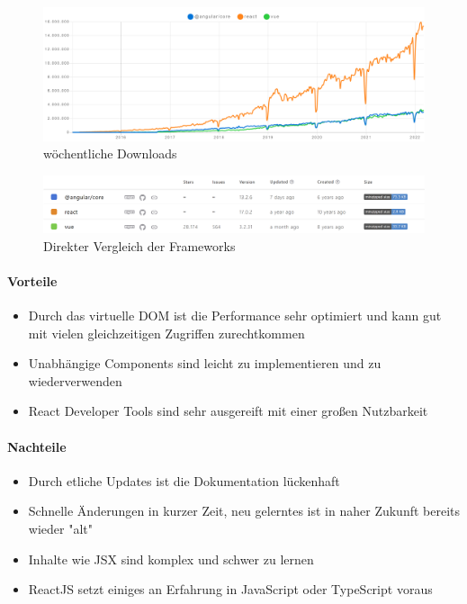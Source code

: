 \begin{figure}[hbt!]
    \centering
    \includegraphics[scale=0.15]{pics/angular-react-vue-npm-chart}
    \caption{wöchentliche Downloads~\cite{angular-react-vue-stats}}
    \label{fig:angular-react-vue-chart}
\end{figure}
\begin{figure}[hbt!]
    \centering
    \includegraphics[scale=0.5]{pics/angular-react-vue-npm-stats}
    \caption{Direkter Vergleich der Frameworks~\cite{angular-react-vue-stats}}
    \label{fig:angular-react-vue-stats}
\end{figure}

\paragraph{Vorteile}
\begin{itemize}
    \item Durch das virtuelle DOM ist die Performance sehr optimiert und kann gut mit vielen gleichzeitigen Zugriffen zurechtkommen
    \item Unabhängige Components sind leicht zu implementieren und zu wiederverwenden
    \item React Developer Tools sind sehr ausgereift mit einer großen Nutzbarkeit
\end{itemize}

\paragraph{Nachteile}
\begin{itemize}
    \item Durch etliche Updates ist die Dokumentation lückenhaft
    \item Schnelle Änderungen in kurzer Zeit, neu gelerntes ist in naher Zukunft bereits wieder "alt"
    \item Inhalte wie JSX sind komplex und schwer zu lernen
    \item ReactJS setzt einiges an Erfahrung in JavaScript oder TypeScript voraus
\end{itemize}

